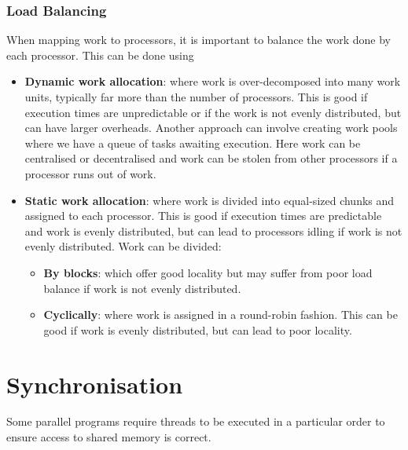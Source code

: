 \documentclass{article}
\begin{document}
\subsubsection{Load Balancing} When mapping work to processors, it is important to balance the work
done by each processor. This can be done using
\begin{itemize}
    \item \textbf{Dynamic work allocation}: where work is over-decomposed
          into many work units, typically far more than the number of
          processors. This is good if execution times are unpredictable
          or if the work is not evenly distributed, but can have
          larger overheads. Another approach can involve creating work
          pools where we have a queue of tasks awaiting execution. Here
          work can be centralised or decentralised and work can be
          stolen from other processors if a processor runs out of work.
    \item \textbf{Static work allocation}: where work is divided into
          equal-sized chunks and assigned to each processor. This is
          good if execution times are predictable and work is evenly
          distributed, but can lead to processors idling if work is not
          evenly distributed. Work can be divided:
          \begin{itemize}
              \item \textbf{By blocks}: which offer good locality
                    but may suffer from poor load balance if work is not
                    evenly distributed.
              \item \textbf{Cyclically}: where work is assigned in a
                    round-robin fashion. This can be good if work is evenly
                    distributed, but can lead to poor locality.
          \end{itemize}
\end{itemize}
\section{Synchronisation}
Some parallel programs require threads to be executed in a particular
order to ensure access to shared memory is correct.
\end{document}
